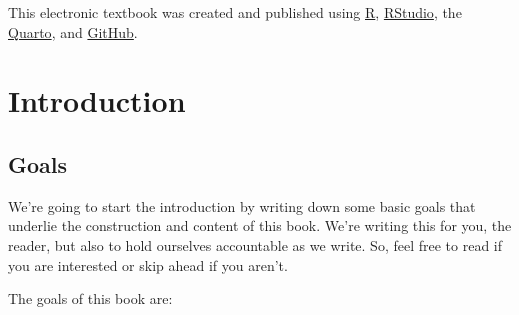 \documentclass[
  letterpaper,
  DIV=11,
  numbers=noendperiod]{scrreprt}
\begin{document}
This electronic textbook was created and published using
\href{https://cran.r-project.org/}{R},
\href{https://www.rstudio.com/}{RStudio}, the
\href{https://quarto.org/}{Quarto}, and
\href{https://github.com/}{GitHub}.


\chapter*{Introduction}\label{introduction}


\section*{Goals}\label{goals}


We're going to start the introduction by writing down some basic goals
that underlie the construction and content of this book. We're writing
this for you, the reader, but also to hold ourselves accountable as we
write. So, feel free to read if you are interested or skip ahead if you
aren't.

The goals of this book are:
\end{document}
